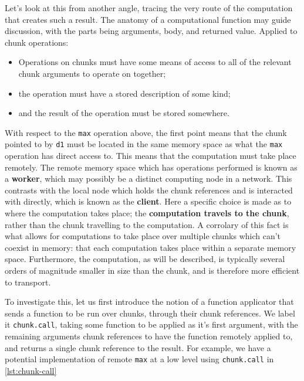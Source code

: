 Let's look at this from another angle, tracing the very route of the
computation that creates such a result. The anatomy of a computational
function may guide discussion, with the parts being arguments, body, and
returned value. Applied to chunk operations:

\begin{itemize}

    \item
          Operations on chunks must have some means of access to all of the
          relevant chunk arguments to operate on together;
    \item
          the operation must have a stored description of some kind;
    \item
          and the result of the operation must be stored somewhere.
\end{itemize}

With respect to the \texttt{max} operation above, the first point means
that the chunk pointed to by \texttt{d1} must be located in the same
memory space as what the \texttt{max} operation has direct access to.
This means that the computation must take place remotely. The remote
memory space which has operations performed is known as a
\textbf{worker}, which may possibly be a distinct computing node in a
network. This contrasts with the local node which holds the chunk
references and is interacted with directly, which is known as the
\textbf{client}. Here a specific choice is made as to where the
computation takes place; the \textbf{computation travels to the chunk},
rather than the chunk travelling to the computation. A corrolary of this
fact is what allows for computations to take place over multiple chunks
which can't coexist in memory: that each computation takes place within
a separate memory space. Furthermore, the computation, as will be
described, is typically several orders of magnitude smaller in size than
the chunk, and is therefore more efficient to transport.

To investigate this, let us first introduce the notion of a function
applicator that sends a function to be run over chunks, through their
chunk references. We label it \texttt{chunk.call}, taking some function
to be applied as it's first argument, with the remaining arguments chunk
references to have the function remotely applied to, and returns a
single chunk reference to the result. For example, we have a potential
implementation of remote \texttt{max} at a low level using
\texttt{chunk.call} in \ref{lst:chunk-call}


